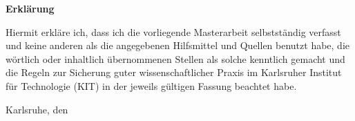 {\begin{titlepage}
	\vspace*{\fill}
	{\Large\textbf{Erklärung}\par}\bigskip%
	Hiermit erkläre ich, dass ich die vorliegende Masterarbeit selbstständig verfasst und keine anderen als die angegebenen Hilfsmittel und Quellen benutzt habe, die wörtlich oder inhaltlich übernommenen Stellen als solche kenntlich gemacht und die Regeln zur Sicherung guter wissenschaftlicher Praxis im Karlsruher Institut für Technologie (KIT) in der jeweils gültigen Fassung beachtet habe.\par\bigskip%
	Karlsruhe, den \EndDatum\par\vspace{5ex}%
\end{titlepage}



}

\maketitle 

